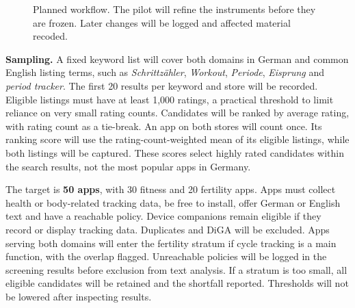 \documentclass[sigconf,nonacm,natbib=false]{acmart}
\begin{document}
\begin{figure}[t]
\centering
{}
\caption{Planned workflow. The pilot will refine the instruments before they
are frozen. Later changes will be logged and affected material recoded.}
\label{fig:pipeline}
\end{figure}

\textbf{Sampling.} A fixed keyword list will cover both domains in German
and common English listing terms, such as \emph{Schrittzähler}, \emph{Workout},
\emph{Periode}, \emph{Eisprung} and \emph{period tracker}. The first 20 results
per keyword and store will be recorded. Eligible listings must have at least
1{,}000 ratings, a practical threshold to limit reliance on very small rating
counts. Candidates will be ranked by average rating, with rating count as a
tie-break. An app on both stores will count once. Its ranking score will use
the rating-count-weighted mean of its eligible listings, while both listings
will be captured. These scores select highly rated candidates within the
search results, not the most popular apps in Germany.

The target is \textbf{50 apps}, with 30 fitness and 20 fertility apps. Apps
must collect health or body-related tracking data, be free to install, offer
German or English text and have a reachable policy. Device companions remain
eligible if they record or display tracking data. Duplicates and DiGA will be
excluded. Apps serving both domains will enter the fertility stratum if cycle
tracking is a main function, with the overlap flagged. Unreachable policies
will be logged in the screening results before exclusion from text analysis.
If a stratum is too small, all eligible candidates will be retained and the
shortfall reported. Thresholds will not be lowered after inspecting results.
\end{document}
